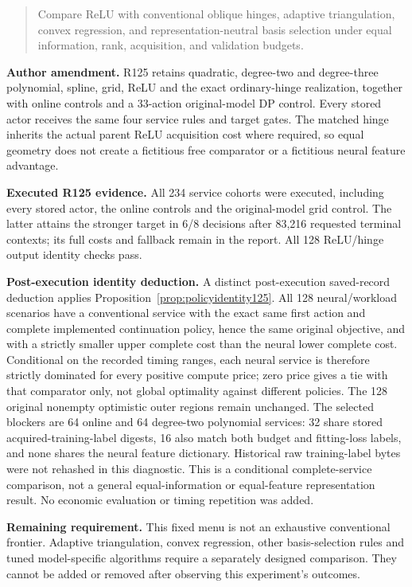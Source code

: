 \begin{quote}\small
Compare ReLU with conventional oblique hinges, adaptive triangulation, convex regression, and representation-neutral basis selection under equal information, rank, acquisition, and validation budgets.
\end{quote}

\noindent\textbf{Author amendment.} R125 retains quadratic, degree-two and degree-three polynomial, spline, grid, ReLU and the exact ordinary-hinge realization, together with online controls and a 33-action original-model DP control. Every stored actor receives the same four service rules and target gates. The matched hinge inherits the actual parent ReLU acquisition cost where required, so equal geometry does not create a fictitious free comparator or a fictitious neural feature advantage.

\noindent\textbf{Executed R125 evidence.} All 234 service cohorts were executed, including every stored actor, the online controls and the original-model grid control. The latter attains the stronger target in 6/8 decisions after 83,216 requested terminal contexts; its full costs and fallback remain in the report. All 128 ReLU/hinge output identity checks pass.

\noindent\textbf{Post-execution identity deduction.} A distinct post-execution saved-record deduction applies Proposition~\ref{prop:policyidentity125}. All 128 neural/workload scenarios have a conventional service with the exact same first action and complete implemented continuation policy, hence the same original objective, and with a strictly smaller upper complete cost than the neural lower complete cost. Conditional on the recorded timing ranges, each neural service is therefore strictly dominated for every positive compute price; zero price gives a tie with that comparator only, not global optimality against different policies. The 128 original nonempty optimistic outer regions remain unchanged. The selected blockers are 64 online and 64 degree-two polynomial services: 32 share stored acquired-training-label digests, 16 also match both budget and fitting-loss labels, and none shares the neural feature dictionary. Historical raw training-label bytes were not rehashed in this diagnostic. This is a conditional complete-service comparison, not a general equal-information or equal-feature representation result. No economic evaluation or timing repetition was added.

\noindent\textbf{Remaining requirement.} This fixed menu is not an exhaustive conventional frontier. Adaptive triangulation, convex regression, other basis-selection rules and tuned model-specific algorithms require a separately designed comparison. They cannot be added or removed after observing this experiment's outcomes.

